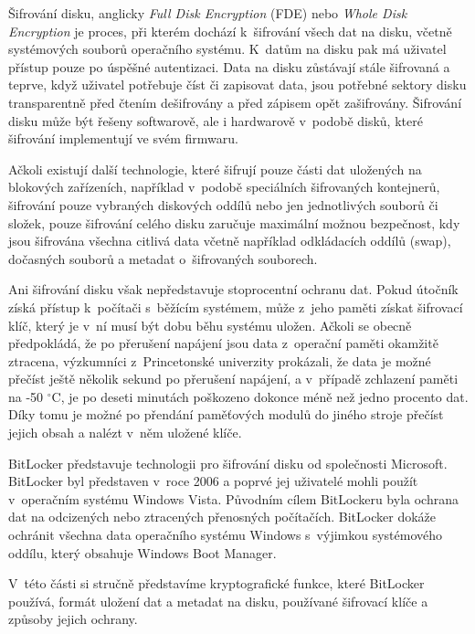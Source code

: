 \label{sec:fde}

Šifrování disku, anglicky \emph{Full Disk Encryption} (FDE) nebo \emph{Whole Disk Encryption} je proces, při kterém dochází k~šifrování všech dat na disku, včetně systémových souborů operačního systému. K~datům na disku pak má uživatel přístup pouze po úspěšné autentizaci. Data na disku zůstávají stále šifrovaná a teprve, když uživatel potřebuje číst či zapisovat data, jsou potřebné sektory disku transparentně před čtením dešifrovány a před zápisem opět zašifrovány. Šifrování disku může být řešeny softwarově, ale i hardwarově v~podobě disků, které šifrování implementují ve svém firmwaru.

Ačkoli existují další technologie, které šifrují pouze části dat uložených na blokových zařízeních, například v~podobě speciálních šifrovaných kontejnerů, šifrování pouze vybraných diskových oddílů nebo jen jednotlivých souborů či složek, pouze šifrování celého disku zaručuje maximální možnou bezpečnost, kdy jsou šifrována všechna citlivá data včetně například odkládacích oddílů (swap), dočasných souborů a metadat o~ši\-fro\-va\-ných souborech.\cite{Scarfone2007}

Ani šifrování disku však nepředstavuje stoprocentní ochranu dat. Pokud útočník získá přístup k~počítači s~běžícím systémem, může z~jeho paměti získat šifrovací klíč, který je v~ní musí být dobu běhu systému uložen. Ačkoli se obecně předpokládá, že po přerušení napájení jsou data z~operační paměti okamžitě ztracena, výzkumníci z~Princetonské univerzity prokázali, že data je možné přečíst ještě několik sekund po přerušení napájení, a v~případě zchlazení paměti na -50 $^{\circ}$C, je po deseti minutách poškozeno dokonce méně než jedno procento dat. Díky tomu je možné po přendání paměťových modulů do jiného stroje přečíst jejich obsah a nalézt v~něm uložené klíče.\cite{Halderman20090501}


BitLocker představuje technologii pro šifrování disku od společnosti Microsoft. BitLocker byl představen v~roce 2006 a poprvé jej uživatelé mohli použít v~ope\-rač\-ním systému Windows Vista. Původním cílem BitLockeru byla ochrana dat na odcizených nebo ztracených přenosných počítačích.\cite{Ferguson2006} BitLocker dokáže ochránit všechna data ope\-rač\-ní\-ho systému Windows s~výjimkou systémového oddílu, který obsahuje Windows Boot Manager.\cite{Hall20191}

V~této části si stručně představíme kryptografické funkce, které BitLocker používá, formát uložení dat a metadat na disku, používané šifrovací klíče a způsoby jejich ochrany.

